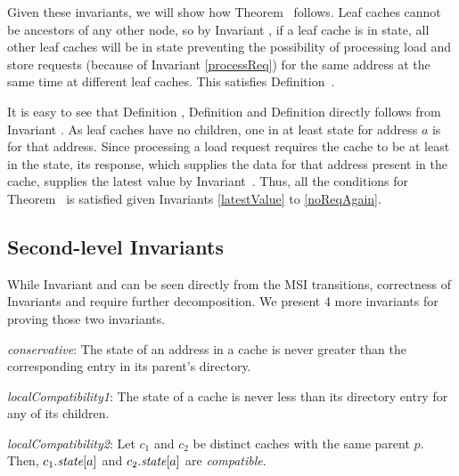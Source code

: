 Given these invariants, we will show how Theorem~
follows.
Leaf caches cannot be ancestors of any other node, so by Invariant
, if a leaf cache is in \Mo{} state, all other
leaf caches will be in \In{} state preventing the possibility of processing
load and store requests (because of Invariant \ref{processReq}) for the same
address at the same time at different leaf caches. This satisfies
Definition~.

It is easy to see that Definition , Definition
 and Definition  directly follows
from Invariant .  As leaf caches have no children, one in
at least \Sh{} state for address $a$ is \clean{} for that address. Since
processing a load request requires the cache to be at least in the \Sh{} state,
its response, which supplies the data for that address present in the cache,
supplies the latest value by Invariant~. Thus, all the
conditions for Theorem~ is satisfied given Invariants
\ref{latestValue} to \ref{noReqAgain}.


\subsection{Second-level Invariants}
\label{secondLevel}

While Invariant  and  can be seen
directly from the MSI transitions, correctness of Invariants
 and  require further
decomposition. We present 4 more invariants for proving those two invariants.

\begin{inv}
\textit{conservative}: The state of an address in a cache is never greater than
the corresponding entry in its parent's directory.
\label{conservative}
\end{inv}

\begin{inv}
\textit{localCompatibility1}:
The state of a cache is never less than its directory entry for any of
its children.
\label{localCompatibility1}
\end{inv}
\begin{inv}
\textit{localCompatibility2}: Let $c_1$ and $c_2$ be distinct caches with the
same parent $p$. Then, $c_1.\textit{state}[a]$ and $c_2.\textit{state}[a]$ are
\textit{compatible}.
\label{localCompatibility2}
\end{inv}

